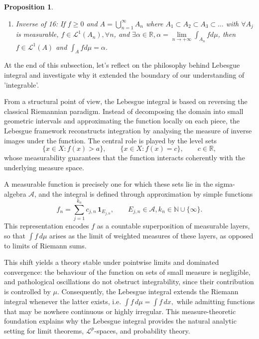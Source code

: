 \documentclass[12pt]{article}
\theoremstyle{blueplain}
\newtheorem{proposition}[theorem]{Proposition}
\theoremstyle{bluedef}
\theoremstyle{blueremark}
\newcommand{\R}{\mathbb{R}}
\newcommand{\N}{\mathbb{N}}
\numberwithin{equation}{section}
\begin{document}
\begin{proposition}
\begin{enumerate}
\begin{proof}
            $\int_A f d\mu = \sum_{n=1}^{\infty} \int_{A_j^\prime} f d\mu = \lim\limits_{N \to \infty} \sum_{j=1}^{N} \int_{A_j^\prime} f d\mu = \lim\limits_{N \to +\infty} \int_{\bigsqcup_{j=1}^{N} A_j^\prime} f d\mu = \lim\limits_{N \to +\infty} \int_{A_N} f d\mu$.
          \end{proof}

    \item Inverse of 16: If $f \geq 0$ and $A = \bigcup_{n=1}^{\infty} A_n$ where $A_1 \subset A_2 \subset A_3 \subset \ldots$ with $\forall A_j$ is measurable, $f \in \mathcal{L}^1(A_n), \forall n$, and $\exists \alpha \in \R, \alpha = \lim\limits_{n \to +\infty} \int_{A_n} f d\mu$, then $f \in \mathcal{L}^1(A)$ and $\int_A f d\mu = \alpha$.
  \end{enumerate}
\end{proposition}

At the end of this subsection, let's reflect on the philosophy behind Lebesgue integral and investigate why it extended the boundary of our understanding of 'integrable'.

From a structural point of view, the Lebesgue integral is based on reversing the classical Riemannian paradigm. Instead of decomposing the domain into small geometric intervals and approximating the function locally on each piece, the Lebesgue framework reconstructs integration by analysing the measure of inverse images under the function. The central role is played by the level sets
\[
  \{x \in X : f(x) > a\}, \qquad
  \{x \in X : f(x) = c\}, \qquad c \in \mathbb{R},
\]
whose measurability guarantees that the function interacts coherently with the underlying measure space.

A measurable function is precisely one for which these sets lie in the sigma-algebra \(\mathcal{A}\), and the integral is defined through approximation by simple functions
\[
  f_n = \sum_{j=1}^{k_n} c_{j,n}\, \mathbf{1}_{E_{j,n}},
  \qquad E_{j,n} \in \mathcal{A}, k_n \in \N \cup \{\infty\}.
\]
This representation encodes \(f\) as a countable superposition of measurable layers, so that
\(
\int f\, d\mu
\)
arises as the limit of weighted measures of these layers, as opposed to limits of Riemann sums.

This shift yields a theory stable under pointwise limits and dominated convergence: the behaviour of the function on sets of small measure is negligible, and pathological oscillations do not obstruct integrability, since their contribution is controlled by \(\mu\). Consequently, the Lebesgue integral extends the Riemann integral whenever the latter exists, i.e.
\(
\int f\, d\mu = \int f\, dx,
\)
while admitting functions that may be nowhere continuous or highly irregular. This measure-theoretic foundation explains why the Lebesgue integral provides the natural analytic setting for limit theorems, \(\mathcal{L}^p\)-spaces, and probability theory.
\end{document}
